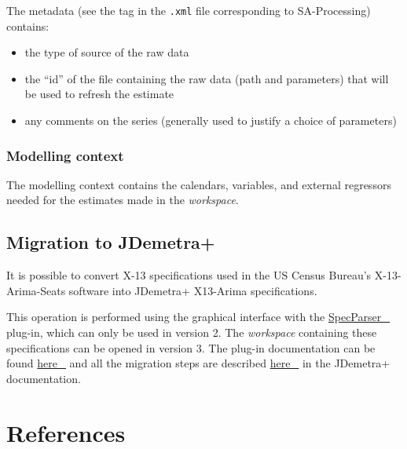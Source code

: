 \documentclass[
  letterpaper,
  DIV=11,
  numbers=noendperiod]{scrreprt}
\begin{document}
The metadata (see the tag in the \texttt{.xml} file corresponding to
SA-Processing) contains:

\begin{itemize}
\item
  the type of source of the raw data
\item
  the ``id'' of the file containing the raw data (path and parameters)
  that will be used to refresh the estimate
\item
  any comments on the series (generally used to justify a choice of
  parameters)
\end{itemize}

\hypertarget{sec-concept-modelling-context}{%
\subsection*{Modelling context}\label{sec-concept-modelling-context}}

The modelling context contains the calendars, variables, and external
regressors needed for the estimates made in the \emph{workspace}.

\hypertarget{mig-to-jd}{%
\section*{Migration to JDemetra+}\label{mig-to-jd}}


It is possible to convert X-13 specifications used in the US Census
Bureau's X-13-Arima-Seats software into JDemetra+ X13-Arima
specifications.

This operation is performed using the graphical interface with the
\href{https://github.com/bbkrd/SpecParser}{SpecParser~🔗} plug-in, which
can only be used in version 2. The \emph{workspace} containing these
specifications can be opened in version 3. The plug-in documentation can
be found \href{https://bbkrd.github.io/pages/specparser/}{here~🔗} and
all the migration steps are described
\href{https://bbkrd.github.io/pages/specparser/}{here~🔗} in the
JDemetra+ documentation.


\hypertarget{references}{%
\chapter*{References}\label{references}}
\end{document}
